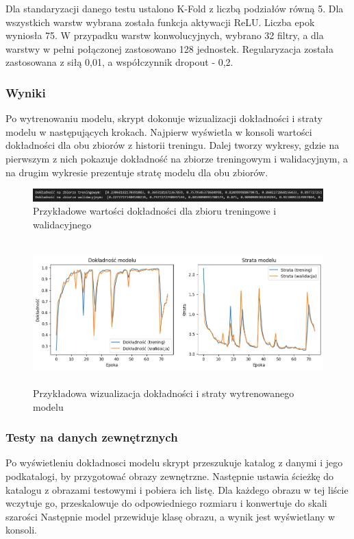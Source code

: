 Dla standaryzacji danego testu ustalono K-Fold z liczbą podziałów równą 5.
Dla wszystkich warstw wybrana została funkcja aktywacji ReLU.
Liczba epok wyniosła 75.
W przypadku warstw konwolucyjnych, wybrano 32 filtry, a dla warstwy w pełni połączonej zastosowano 128 jednostek.
Regularyzacja została zastosowana z siłą 0,01, a współczynnik dropout - 0,2.

\subsubsection{Wyniki}
Po wytrenowaniu modelu, skrypt dokonuje wizualizacji dokładności i straty modelu w następujących krokach.
Najpierw wyświetla w konsoli wartości dokładności dla obu zbiorów z historii treningu.
Dalej tworzy wykresy, gdzie na pierwszym z nich pokazuje dokładność na zbiorze treningowym i walidacyjnym,
a na drugim wykresie prezentuje stratę modelu dla obu zbiorów.

\begin{figure}[ht]
	\centering
	\includegraphics[width=15cm]{resources/tests/images/scr-standard-result.png}
	\caption{Przykładowe wartości dokładności dla zbioru treningowe i walidacyjnego}
	\label{Fig:tests-wyniki-2}
\end{figure}
\FloatBarrier

\begin{figure}[ht]
	\centering
	\includegraphics[height=5.5cm]{resources/tests/images/v2_epoch75.png}
	\caption{Przykładowa wizualizacja dokładności i straty wytrenowanego modelu}
	\label{Fig:tests-wyniki-1}
\end{figure}
\FloatBarrier

\subsubsection{Testy na danych zewnętrznych}
Po wyświetleniu dokładnosci modelu skrypt przeszukuje katalog z danymi i jego podkatalogi, by przygotować obrazy zewnętrzne.
Następnie ustawia ścieżkę do katalogu z obrazami testowymi i pobiera ich listę.
Dla każdego obrazu w tej liście wczytuje go, przeskalowuje do odpowiedniego rozmiaru i konwertuje do skali szarości
Następnie model przewiduje klasę obrazu, a wynik jest wyświetlany w konsoli.